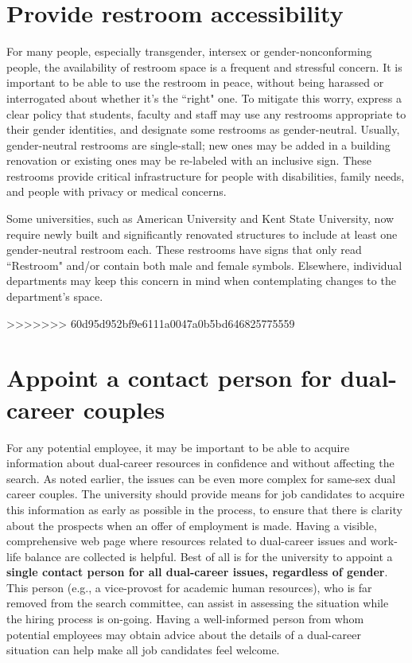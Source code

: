 \section {Provide restroom accessibility}
\label{restrooms}
For many people, especially transgender, intersex or gender-nonconforming people, the availability of restroom space is a frequent and stressful concern. It is important to be able to use the restroom in peace, without being harassed or interrogated about whether it's the ``right" one. To mitigate this worry, express a clear policy that students, faculty and staff may use any restrooms appropriate to their gender identities, and designate some restrooms as gender-neutral. Usually, gender-neutral restrooms are single-stall; new ones may be added in a building renovation or existing ones may be re-labeled with an inclusive sign. These restrooms provide critical infrastructure for people with disabilities, family needs, and people with privacy or medical concerns.

Some universities, such as American University and Kent State University, now require newly built and significantly renovated structures to include at least one gender-neutral restroom each. These restrooms have signs that only read ``Restroom" and/or contain both male and female symbols. Elsewhere, individual departments may keep this concern in mind when contemplating changes to the department's space.

>>>>>>> 60d95d952bf9e6111a0047a0b5bd646825775559
\section {Appoint a contact person for dual-career couples}
\label{dual-career-contact}
For any potential employee, it may be important to be able to acquire information about dual-career resources in confidence and without affecting the search.  As noted earlier, the issues can be even more complex for same-sex dual career couples. The university should provide means for job candidates to acquire this information as early as possible in the process, to ensure that there is clarity about the prospects when an offer of employment is made.  Having a visible, comprehensive web page where resources related to dual-career issues and work-life balance are collected is helpful.  Best of all is for the university to appoint a \textbf{single contact person for all dual-career issues, regardless of gender}. This person (e.g., a vice-provost for academic human resources), who is far removed from the search committee, can assist in assessing the situation while the hiring process is on-going.  Having a well-informed person from whom potential employees may obtain advice about the details of a dual-career situation can help make all job candidates feel welcome.


